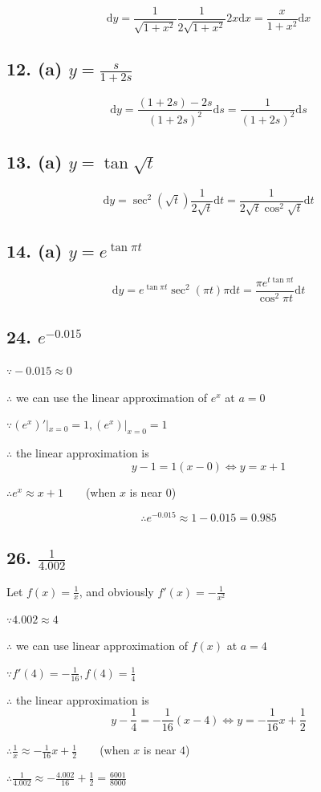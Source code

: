 \documentclass{article}
\begin{document}
    $$\mathrm dy = \frac{1}{\sqrt{1 + x^2}} \frac{1}{2\sqrt{1 + x^2}} 2x \mathrm dx = \frac{x}{1 + x^2}\mathrm dx$$

    \subsection*{12. (a) $y = \frac{s}{1 + 2s}$}

    $$\mathrm dy = \frac{(1 + 2s) - 2s}{(1 + 2s)^2} \mathrm ds = \frac{1}{(1 + 2s)^2} \mathrm ds$$

    \subsection*{13. (a) $y = \tan \sqrt t$}

    $$\mathrm dy = \sec^2 (\sqrt t) \frac{1}{2\sqrt t} \mathrm dt = \frac{1}{2\sqrt t \cos^2 \sqrt t} \mathrm dt$$

    \subsection*{14. (a) $y = e^{\tan \pi t}$}

    $$\mathrm dy = e^{\tan \pi t} \sec ^2 (\pi t) \pi \mathrm dt = \frac{\pi e^{t \tan \pi t}}{\cos ^2 \pi t} \mathrm dt$$

    \subsection*{24. $e^{-0.015}$}

    $\because -0.015 \approx 0$

    $\therefore$ we can use the linear approximation of $e^x$ at $a = 0$

    $\because (e^x)'|_{x = 0} = 1, (e^x)|_{x = 0} = 1$
    
    $\therefore$ the linear approximation is $$y - 1 = 1(x - 0) \iff y = x + 1$$

    $\therefore e^x \approx x + 1 \qquad$(when $x$ is near $0$)

    $$\therefore e^{-0.015} \approx 1 - 0.015 = 0.985$$

    \subsection*{26. $\frac{1}{4.002}$}

    Let $f(x) = \frac{1}{x}$, and obviously $f'(x) = -\frac{1}{x^2}$

    $\because 4.002 \approx 4$

    $\therefore$ we can use linear approximation of $f(x)$ at $a = 4$

    $\because f'(4) = -\frac{1}{16}, f(4) = \frac 1 4$

    $\therefore$ the linear approximation is $$y - \frac 1 4 = -\frac{1}{16}(x - 4) \iff y = -\frac{1}{16}x + \frac{1}{2}$$

    $\therefore \frac 1 x \approx -\frac{1}{16}x + \frac 1 2 \qquad$(when $x$ is near $4$)

    $\therefore \frac{1}{4.002} \approx -\frac{4.002}{16} + \frac{1}{2} = \frac{6001}{8000}$

\end{document}
